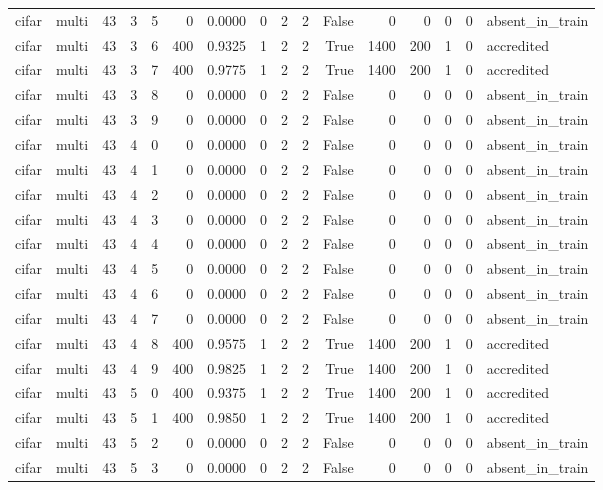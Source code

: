 \begin{tabular}{llrrrrrrrrrrrrrl}
cifar & multi & 43 & 3 & 5 & 0 & 0.0000 & 0 & 2 & 2 & False & 0 & 0 & 0 & 0 & absent\_in\_train \\
cifar & multi & 43 & 3 & 6 & 400 & 0.9325 & 1 & 2 & 2 & True & 1400 & 200 & 1 & 0 & accredited \\
cifar & multi & 43 & 3 & 7 & 400 & 0.9775 & 1 & 2 & 2 & True & 1400 & 200 & 1 & 0 & accredited \\
cifar & multi & 43 & 3 & 8 & 0 & 0.0000 & 0 & 2 & 2 & False & 0 & 0 & 0 & 0 & absent\_in\_train \\
cifar & multi & 43 & 3 & 9 & 0 & 0.0000 & 0 & 2 & 2 & False & 0 & 0 & 0 & 0 & absent\_in\_train \\
cifar & multi & 43 & 4 & 0 & 0 & 0.0000 & 0 & 2 & 2 & False & 0 & 0 & 0 & 0 & absent\_in\_train \\
cifar & multi & 43 & 4 & 1 & 0 & 0.0000 & 0 & 2 & 2 & False & 0 & 0 & 0 & 0 & absent\_in\_train \\
cifar & multi & 43 & 4 & 2 & 0 & 0.0000 & 0 & 2 & 2 & False & 0 & 0 & 0 & 0 & absent\_in\_train \\
cifar & multi & 43 & 4 & 3 & 0 & 0.0000 & 0 & 2 & 2 & False & 0 & 0 & 0 & 0 & absent\_in\_train \\
cifar & multi & 43 & 4 & 4 & 0 & 0.0000 & 0 & 2 & 2 & False & 0 & 0 & 0 & 0 & absent\_in\_train \\
cifar & multi & 43 & 4 & 5 & 0 & 0.0000 & 0 & 2 & 2 & False & 0 & 0 & 0 & 0 & absent\_in\_train \\
cifar & multi & 43 & 4 & 6 & 0 & 0.0000 & 0 & 2 & 2 & False & 0 & 0 & 0 & 0 & absent\_in\_train \\
cifar & multi & 43 & 4 & 7 & 0 & 0.0000 & 0 & 2 & 2 & False & 0 & 0 & 0 & 0 & absent\_in\_train \\
cifar & multi & 43 & 4 & 8 & 400 & 0.9575 & 1 & 2 & 2 & True & 1400 & 200 & 1 & 0 & accredited \\
cifar & multi & 43 & 4 & 9 & 400 & 0.9825 & 1 & 2 & 2 & True & 1400 & 200 & 1 & 0 & accredited \\
cifar & multi & 43 & 5 & 0 & 400 & 0.9375 & 1 & 2 & 2 & True & 1400 & 200 & 1 & 0 & accredited \\
cifar & multi & 43 & 5 & 1 & 400 & 0.9850 & 1 & 2 & 2 & True & 1400 & 200 & 1 & 0 & accredited \\
cifar & multi & 43 & 5 & 2 & 0 & 0.0000 & 0 & 2 & 2 & False & 0 & 0 & 0 & 0 & absent\_in\_train \\
cifar & multi & 43 & 5 & 3 & 0 & 0.0000 & 0 & 2 & 2 & False & 0 & 0 & 0 & 0 & absent\_in\_train \\

\end{tabular}
